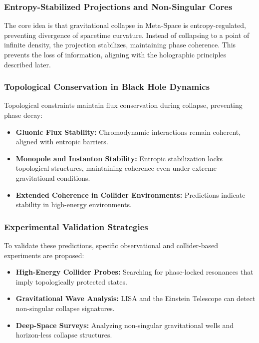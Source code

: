 \documentclass[10.5pt,a4paper]{article}
\begin{document}
\subsubsection{Entropy-Stabilized Projections and Non-Singular Cores}

The core idea is that gravitational collapse in Meta-Space is entropy-regulated, preventing divergence of spacetime curvature. 
Instead of collapsing to a point of infinite density, the projection stabilizes, maintaining phase coherence. This prevents 
the loss of information, aligning with the holographic principles described later.

\subsubsection{Topological Conservation in Black Hole Dynamics}

Topological constraints maintain flux conservation during collapse, preventing phase decay:
\begin{itemize}
    \item \textbf{Gluonic Flux Stability:} Chromodynamic interactions remain coherent, aligned with entropic barriers.
    \item \textbf{Monopole and Instanton Stability:} Entropic stabilization locks topological structures, maintaining coherence even under extreme gravitational conditions.
    \item \textbf{Extended Coherence in Collider Environments:} Predictions indicate stability in high-energy environments.
\end{itemize}

\subsubsection{Experimental Validation Strategies}

To validate these predictions, specific observational and collider-based experiments are proposed:
\begin{itemize}
    \item \textbf{High-Energy Collider Probes:} Searching for phase-locked resonances that imply topologically protected states.
    \item \textbf{Gravitational Wave Analysis:} LISA and the Einstein Telescope can detect non-singular collapse signatures.
    \item \textbf{Deep-Space Surveys:} Analyzing non-singular gravitational wells and horizon-less collapse structures.
\end{itemize}
\end{document}
